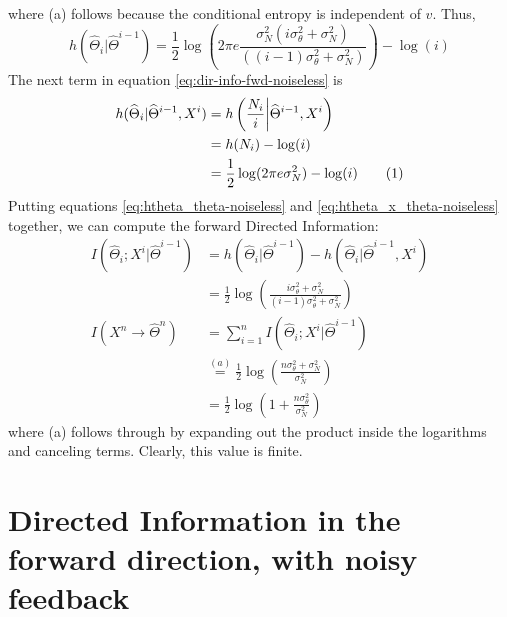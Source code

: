 \documentclass[conference]{IEEEtran}
\newcommand\numberthis{\stepcounter{equation}\tag{\theequation}}
\begin{document}
where (a) follows because the conditional entropy is independent of $v$. Thus,
\begin{equation}
	h(\widehat{\Theta}_{i}|\widehat{\Theta}^{i-1}) = \frac{1}{2}\log\left(2\pi e\frac{\sigma_{N}^{2}(i\sigma_{\theta}^{2}+\sigma_{N}^{2})}{((i-1)\sigma_{\theta}^{2}+\sigma_{N}^{2})}\right)-\log(i) \label{eq:htheta_theta-noiseless}
\end{equation}
The next term in equation \eqref{eq:dir-info-fwd-noiseless} is
\begin{align*}
	h(\widehat{\Theta}_{i}|\widehat{\Theta}^{i-1},X^{i}) &= h\left(\frac{N_{i}}{i}\bigg|\widehat{\Theta}^{i-1},X^{i}\right) \\
												 &= h(N_{i}) -\log(i) \\
												 &= \frac{1}{2}\log(2\pi e\sigma_{N}^{2}) -\log(i) \numberthis \label{eq:htheta_x_theta-noiseless}
\end{align*}
Putting equations \eqref{eq:htheta_theta-noiseless} and \eqref{eq:htheta_x_theta-noiseless} together, we can compute the forward Directed Information:
\begin{align*}
	I(\widehat{\Theta}_{i};X^{i}|\widehat{\Theta}^{i-1}) &= h(\widehat{\Theta}_{i}|\widehat{\Theta}^{i-1}) - h(\widehat{\Theta}_{i}|\widehat{\Theta}^{i-1},X^{i}) \\
	                                             &= \frac{1}{2}\log\left(\frac{i\sigma_{\theta}^{2}+\sigma_{N}^{2}}{(i-1)\sigma_{\theta}^{2}+\sigma_{N}^{2}}\right) \\
	I(X^{n} \rightarrow \widehat{\Theta}^{n})    &= \sum_{i=1}^{n}I(\widehat{\Theta}_{i};X^{i}|\widehat{\Theta}^{i-1}) \\
												 &\overset{(a)}{=} \frac{1}{2}\log\left(\frac{n\sigma_{\theta}^{2}+\sigma_{N}^{2}}{\sigma_{N}^{2}}\right) \\
	                                             &= \frac{1}{2}\log\left(1+\frac{n\sigma_{\theta}^{2}}{\sigma_{N}^{2}}\right)
\end{align*}
where (a) follows through by expanding out the product inside the logarithms and canceling terms. Clearly, this value is finite.

\section{Directed Information in the forward direction, with noisy feedback}
\label{app:appendix1}
\end{document}
